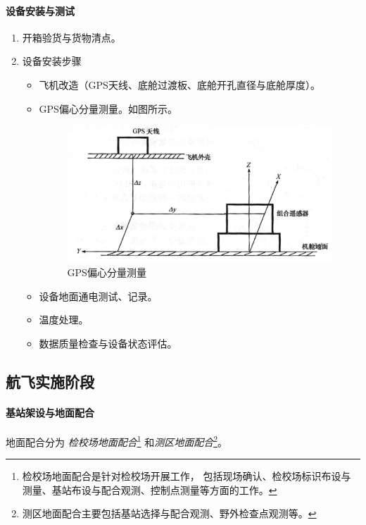 \paragraph{设备安装与测试}
\begin{enumerate}
	\item 开箱验货与货物清点。
	\item 设备安装步骤
		\begin{itemize}
			\item 飞机改造（GPS天线、底舱过渡板、底舱开孔直径与底舱厚度）。
			\item GPS偏心分量测量。如图所示。
				\begin{figure}[htbp]
					\centering
					\includegraphics[width=0.7\linewidth]{figure/Chapter5/GPS偏心分量测量}
					\caption{GPS偏心分量测量}
					\label{fig:GPS偏心分量测量}
				\end{figure}
			\item 设备地面通电测试、记录。
			\item 温度处理。
			\item 数据质量检查与设备状态评估。
		\end{itemize}
\end{enumerate}

\subsection{航飞实施阶段}

\paragraph{基站架设与地面配合}地面配合分为
\textit{检校场地面配合}\footnote{检校场地面配合是针对检校场开展工作， 包括现场确认、检校场标识布设与测量、基站布设与配合观测、控制点测量等方面的工作。}
和\textit{测区地面配合}\footnote{测区地面配合主要包括基站选择与配合观测、野外检查点观测等。}。

